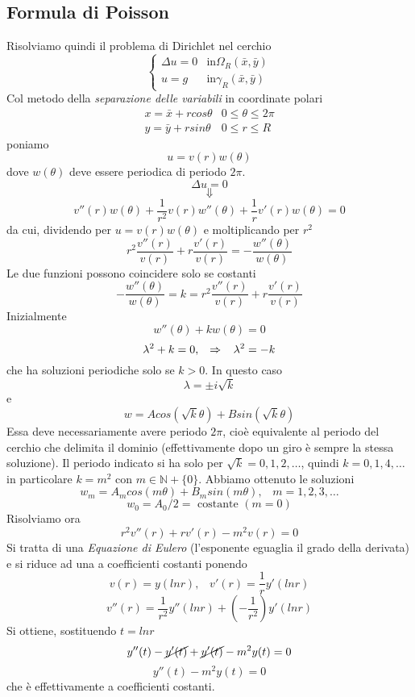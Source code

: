 \subsection{Formula di Poisson}
Risolviamo quindi il problema di Dirichlet nel cerchio
\[
	\left\{
	\begin{array}{ll}
		\Delta u=0 	& \text{in} \Omega_R(\bar{x}, \bar{y}) \\
		u=g 		& \text{in} \gamma_R(\bar{x}, \bar{y})
	\end{array}
	\right.
\]
Col metodo della \textit{separazione delle variabili} in coordinate polari
\[
	\begin{array}{ll}
		x= \bar{x} + rcos \theta & 0 \leq \theta \leq 2 \pi \\
		y= \bar{y} + rsin \theta & 0 \leq r \leq R
	\end{array}
\]
poniamo
\[
	u= v(r)w(\theta)
\]
dove $w(\theta)$ deve essere periodica di periodo $2 \pi$.
\[
	\Delta u = 0
\]
\[
	\Downarrow
\]
\[
	v''(r)w(\theta)+ \frac{1}{r^2}v(r)w''(\theta)+ \frac{1}{r}v'(r)w(\theta)=0
\]
da cui, dividendo per $u= v(r)w(\theta)$ e moltiplicando per $r^2$
\[
	r^2 \frac{ v''(r)}{v(r)} + r \frac{v'(r)}{v(r)}= 
	-\frac{w''(\theta)}{w(\theta)}
\]
Le due funzioni possono coincidere solo se costanti
\[
	- \frac{w''(\theta)}{w(\theta)}= k =
	r^2 \frac{ v''(r)}{v(r)} + r \frac{v'(r)}{v(r)}
\]
Inizialmente
\[
	w''(\theta)+ kw(\theta) =0
\]
\[
	\lambda^2 + k=0, \;\;\; \Rightarrow \;\;\; \lambda^2 = -k
\]
che ha soluzioni periodiche solo se $k > 0$.
In questo caso
\[
	\lambda= \pm i\sqrt{k}
\]
e
\[
	w= Acos(\sqrt{k} \theta)+ Bsin(\sqrt{k} \theta)
\]
Essa deve necessariamente avere periodo $2\pi$, cio\`e equivalente al periodo
del cerchio che delimita il dominio (effettivamente dopo un giro \`e sempre
la stessa soluzione).
Il periodo indicato si ha solo per $\sqrt{k}= 0,1,2,\ldots$, quindi 
$k= 0,1,4, \ldots$ in particolare $k=m^2$ con $m \in \mathbb{N}+\{0\}$.
Abbiamo ottenuto le soluzioni
\[
	w_m= A_m cos (m\theta)+ B_m sin (m \theta), \;\;\; m=1,2,3,\ldots
\]
\[
	w_0= A_0/2= \text{ costante } (m=0)
\]
Risolviamo ora
\[
	r^2 v''(r)+ rv'(r)- m^2 v(r)=0
\]
Si tratta di una \textit{Equazione di Eulero} (l'esponente eguaglia il grado
della derivata) e si riduce ad una a coefficienti costanti ponendo
\[
	v(r)= y(ln r), \;\;\; v'(r)= \frac{1}{r} y'(ln r)
\]
\[
	v''(r)= \frac{1}{r^2}y''(ln r) + \left( - \frac{1}{r^2} \right)y'(ln r)
\]
Si ottiene, sostituendo $t= ln r$
\[
	y''(t)- \cancel{y'(t)}+ \cancel{y'(t)} - m^2 y(t)=0
\]
\[
	y''(t) - m^2 y(t)=0
\]
che \`e effettivamente a coefficienti costanti.\\
